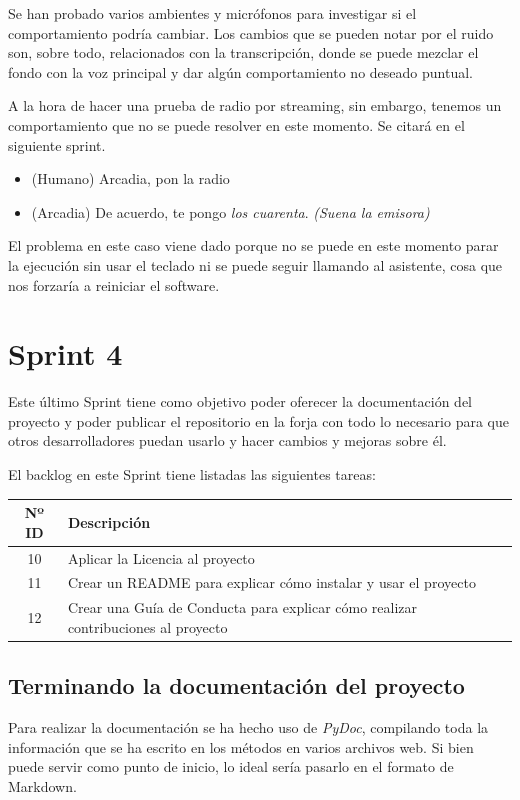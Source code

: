 Se han probado varios ambientes y micrófonos para investigar si el comportamiento podría cambiar. Los cambios que se pueden notar por el ruido son, sobre todo, relacionados con la transcripción, donde se puede mezclar el fondo con la voz principal y dar algún comportamiento no deseado puntual.

A la hora de hacer una prueba de radio por streaming, sin embargo, tenemos un comportamiento que no se puede resolver en este momento. Se citará en el siguiente sprint.
\begin{itemize}
	\item (Humano) Arcadia, pon la radio
	\item (Arcadia) De acuerdo, te pongo \textit{los cuarenta}. \textit{(Suena la emisora)}
\end{itemize}

El problema en este caso viene dado porque no se puede en este momento parar la ejecución sin usar el teclado ni se puede seguir llamando al asistente, cosa que nos forzaría a reiniciar el software.

\section{Sprint 4}
Este último Sprint tiene como objetivo poder oferecer la documentación del proyecto y poder publicar el repositorio en la forja con todo lo necesario para que otros desarrolladores puedan usarlo y hacer cambios y mejoras sobre él.

El backlog en este Sprint tiene listadas las siguientes tareas:
\begin{table}[H]
	\begin{tabularx}{\textwidth}{|c|X|}
		\hline
		{\cellcolor{mintgreen}} \textbf{Nº ID} & {\cellcolor{mintgreen}} \textbf{Descripción} \\
		\hline
		10 &  Aplicar la Licencia al proyecto \\
		\hline
		11 & Crear un README para explicar cómo instalar y usar el proyecto \\ \hline
		12 & Crear una Guía de Conducta para explicar cómo realizar contribuciones al proyecto \\
		\hline
	\end{tabularx}
\end{table}
\subsection{Terminando la documentación del proyecto}
Para realizar la documentación se ha hecho uso de \textit{PyDoc}, compilando toda la información que se ha escrito en los métodos en varios archivos web. Si bien puede servir como punto de inicio, lo ideal sería pasarlo en el formato de Markdown.

